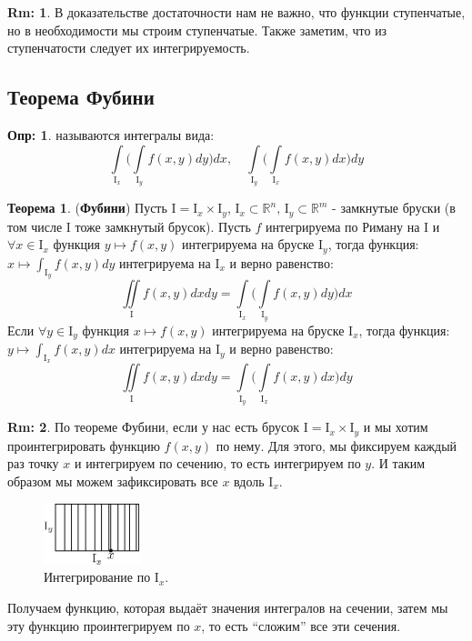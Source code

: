 \documentclass[12pt]{article}
\newcommand{\MR}{\mathbb{R}}
\newcommand{\MI}{\mathrm{I}}
\theoremstyle{definition}
\newtheorem{defn}{Опр:}
\newtheorem{rem}{Rm:}
\newtheorem{theorem}{Теорема}
\begin{document}
\begin{rem}
	В доказательстве достаточности нам не важно, что функции ступенчатые, но в необходимости мы строим ступенчатые. Также заметим, что из ступенчатости следует их интегрируемость.
\end{rem}

\subsection*{Теорема Фубини}
\begin{defn}
	 называются интегралы вида:
	$$
		\int\limits_{\MI_x}\Bigg(\int\limits_{\MI_y}f(x,y)dy\Bigg)dx, \quad \int\limits_{\MI_y}\Bigg(\int\limits_{\MI_x}f(x,y)dx\Bigg)dy
	$$
\end{defn}

\begin{theorem}(\textbf{Фубини})
	Пусть $\MI = \MI_x \times \MI_y$, $\MI_x \subset \MR^n, \, \MI_y \subset \MR^m$ - замкнутые бруски (в том числе $\MI$ тоже замкнутый брусок). Пусть $f$ интегрируема по Риману на $\MI$ и $\forall x \in \MI_x$ функция $y \mapsto f(x,y)$ интегрируема на бруске $\MI_y$, тогда функция: $x \mapsto \int_{\MI_y}f(x,y)dy$ интегрируема на $\MI_x$ и верно равенство:
	$$
		\iint\limits_{\MI} f(x,y)dxdy = \int\limits_{\MI_x}\Bigg(\int\limits_{\MI_y}f(x,y)dy\Bigg)dx
	$$
	Если $\forall y \in \MI_y$ функция $x \mapsto f(x,y)$ интегрируема на бруске $\MI_x$, тогда функция: $y \mapsto \int_{\MI_x}f(x,y)dx$ интегрируема на $\MI_y$ и верно равенство:
	$$
		\iint\limits_{\MI} f(x,y)dxdy = \int\limits_{\MI_y}\Bigg(\int\limits_{\MI_x}f(x,y)dx\Bigg)dy
	$$
\end{theorem}
\begin{rem}
	По теореме Фубини, если у нас есть брусок $\MI =  \MI_x \times \MI_y$ и мы хотим проинтегрировать функцию $f(x,y)$ по нему. Для этого, мы фиксируем каждый раз точку $x$ и интегрируем по сечению, то есть интегрируем по $y$. И таким образом мы можем зафиксировать все $x$ вдоль $\MI_x$.
	\begin{figure}[H]
		\centering
		\includegraphics[width=0.25\textwidth]{MA4L2_3.eps}
		\caption{Интегрирование по $\MI_x$.}
		\label{MA4L2_3}
	\end{figure}
	Получаем функцию, которая выдаёт значения интегралов на сечении, затем мы эту функцию проинтегрируем по $x$, то есть ``сложим'' все эти сечения.
\end{rem}
\end{document}

